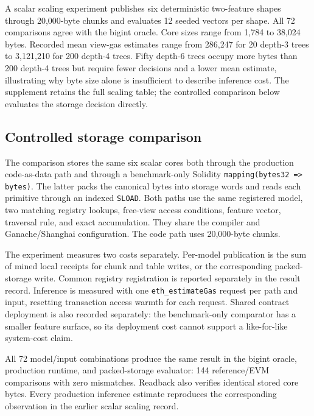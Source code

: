 \documentclass{ledger}
\newcommand{\codeword}[1]{\texttt{#1}}
\begin{document}
A scalar scaling experiment publishes six deterministic two-feature shapes
through 20,000-byte chunks and evaluates 12 seeded vectors per shape. All
72 comparisons agree with the bigint oracle. Core sizes range from 1,784 to
38,024 bytes. Recorded mean view-gas estimates range from 286,247 for 20
depth-3 trees to 3,121,210 for 200 depth-4 trees. Fifty depth-6 trees occupy
more bytes than 200 depth-4 trees but require fewer decisions and a lower
mean estimate, illustrating why byte size alone is insufficient to describe
inference cost. The supplement retains the full scaling table; the controlled
comparison below evaluates the storage decision directly.

\subsection{Controlled storage comparison}
\label{sec:storagecomparison}

The comparison stores the same six scalar cores both through the production
code-as-data path and through a benchmark-only Solidity
\codeword{mapping(bytes32 => bytes)}. The latter packs the canonical bytes
into storage words and reads each primitive through an indexed
\codeword{SLOAD}. Both paths use the same registered model, two matching
registry lookups, free-view access conditions, feature vector, traversal rule,
and exact accumulation. They share the compiler and Ganache/Shanghai
configuration. The code path uses 20,000-byte chunks.

The experiment measures two costs separately. Per-model publication is the
sum of mined local receipts for chunk and table writes, or the corresponding
packed-storage write. Common registry registration is reported separately in
the result record. Inference is measured with one \codeword{eth\_estimateGas}
request per path and input, resetting transaction access warmth for each
request. Shared contract deployment is also recorded separately: the
benchmark-only comparator has a smaller feature surface, so its deployment
cost cannot support a like-for-like system-cost claim.

All 72 model/input combinations produce the same result in the bigint oracle,
production runtime, and packed-storage evaluator: 144 reference/EVM
comparisons with zero mismatches. Readback also verifies identical stored core
bytes. Every production inference estimate reproduces the corresponding
observation in the earlier scalar scaling record.
\end{document}
